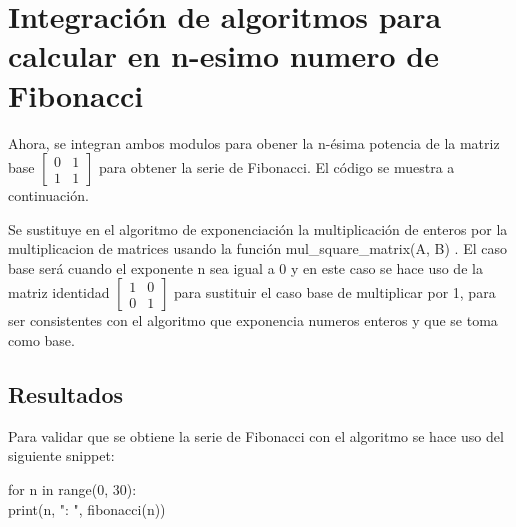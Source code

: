 \documentclass{article}
\begin{document}
\section{Integración de algoritmos para calcular en n-esimo numero de Fibonacci}

Ahora, se integran ambos modulos para obener la n-ésima potencia de la matriz base
\begin{math}
    \begin{bmatrix}
        0 & 1 \\
        1 & 1 
    \end{bmatrix}
\end{math}
para obtener la serie de Fibonacci. \newline
El código se muestra a continuación.

\vspace{5mm} %



\vspace{5mm} %

Se sustituye en el algoritmo de exponenciación la multiplicación de enteros por la multiplicacion de matrices usando la función 
    mul\_square\_matrix(A, B)
. El caso base será cuando el exponente n sea igual a 0 y en este caso se hace uso de la matriz identidad
\begin{math}
    \begin{bmatrix}
        1 & 0 \\
        0 & 1 
    \end{bmatrix}
\end{math}
para sustituir el caso base de multiplicar por 1, para ser consistentes con el algoritmo que exponencia numeros enteros y que se toma como base.

\subsection{Resultados}
Para validar que se obtiene la serie de Fibonacci con el algoritmo se hace uso del siguiente snippet:
\vspace{5mm} %

for n in range(0, 30):\\
        print(n, ": ", fibonacci(n))
\end{document}

